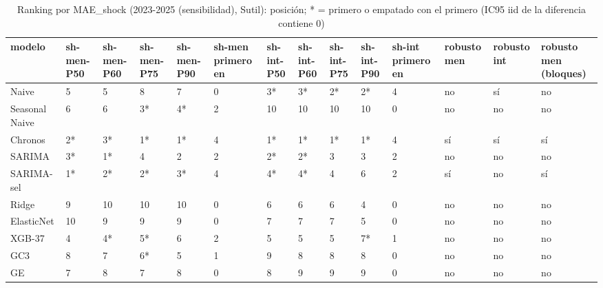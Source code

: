 \begin{table}[H]
\centering
\small
\caption{Ranking por MAE\_shock (2023-2025 (sensibilidad), Sutil): posición; * = primero o empatado con el primero (IC95 iid de la diferencia contiene 0)}
\label{tab:T08_ranking_shock_sensibilidad_2023_2025_sutil}
\begin{tabular}{llllllllllllll}
\toprule
modelo & sh-men-P50 & sh-men-P60 & sh-men-P75 & sh-men-P90 & sh-men primero en & sh-int-P50 & sh-int-P60 & sh-int-P75 & sh-int-P90 & sh-int primero en & robusto men & robusto int & robusto men (bloques) \\
\midrule
Naive & 5 & 5 & 8 & 7 & 0 & 3* & 3* & 2* & 2* & 4 & no & sí & no \\
Seasonal Naive & 6 & 6 & 3* & 4* & 2 & 10 & 10 & 10 & 10 & 0 & no & no & no \\
Chronos & 2* & 3* & 1* & 1* & 4 & 1* & 1* & 1* & 1* & 4 & sí & sí & sí \\
SARIMA & 3* & 1* & 4 & 2 & 2 & 2* & 2* & 3 & 3 & 2 & no & no & no \\
SARIMA-sel & 1* & 2* & 2* & 3* & 4 & 4* & 4* & 4 & 6 & 2 & sí & no & sí \\
Ridge & 9 & 10 & 10 & 10 & 0 & 6 & 6 & 6 & 4 & 0 & no & no & no \\
ElasticNet & 10 & 9 & 9 & 9 & 0 & 7 & 7 & 7 & 5 & 0 & no & no & no \\
XGB-37 & 4 & 4* & 5* & 6 & 2 & 5 & 5 & 5 & 7* & 1 & no & no & no \\
GC3 & 8 & 7 & 6* & 5 & 1 & 9 & 8 & 8 & 8 & 0 & no & no & no \\
GE & 7 & 8 & 7 & 8 & 0 & 8 & 9 & 9 & 9 & 0 & no & no & no \\
\bottomrule
\end{tabular}
\end{table}